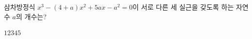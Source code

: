 삼차방정식 $x^3-(4+a)x^2+5ax-a^2=0$이 서로 다른 세 실근을 갖도록 하는 자연수 $a$의 개수는?
\begin{choices32}{$1$}{$2$}{$3$}{$4$}{$5$}\end{choices32}
